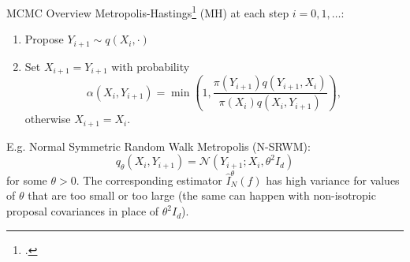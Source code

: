 \documentclass[aspectratio=169]{beamer}
\begin{document}
\begin{frame}{MCMC Overview}
    \alert{Metropolis-Hastings}\footcite{metropolis_equation_1953, hastings_monte_1970} (MH) at each step $i=0,1,\ldots$:
    \begin{enumerate}
        \item Propose $Y_{i+1} \sim q(X_i, \cdot)$
        \item Set $X_{i+1} = Y_{i+1}$ with probability
            $$\alpha(X_i, Y_{i+1}) = \min \left(1, \frac{\pi(Y_{i+1}) q(Y_{i+1}, X_i)}{\pi(X_i) q(X_i, Y_{i+1})} \right),$$
        otherwise $X_{i+1} = X_i$.
    \end{enumerate}

    \onslide<+->

    E.g. \alert{Normal Symmetric Random Walk Metropolis} (N-SRWM):
    $$q_\theta(X_i, Y_{i+1}) = \mathcal{N}(Y_{i+1}; X_i, \theta^2 I_d)$$
    for some $\theta > 0$.
    \onslide<+->
    The corresponding estimator $\hat{I}_N^\theta(f)$ has high variance for values of $\theta$ that are too small or too large (the same can happen with non-isotropic proposal covariances in place of $\theta^2 I_d$).
\end{frame}
\end{document}
